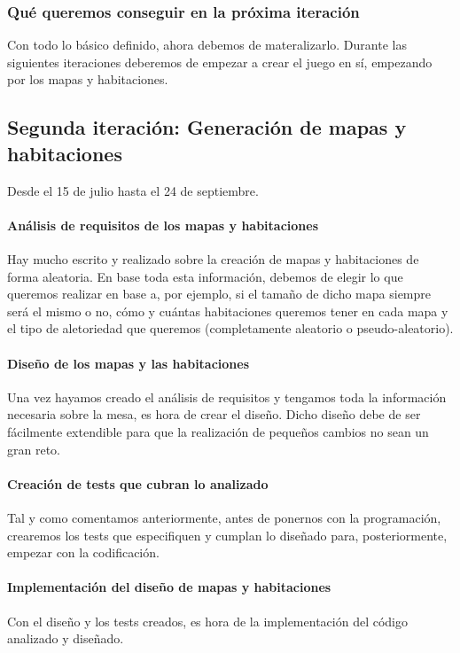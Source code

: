 \subsubsection{Qué queremos conseguir en la próxima iteración}

Con todo lo básico definido, ahora debemos de materalizarlo. Durante las siguientes iteraciones deberemos de empezar a crear el juego en sí, empezando por los mapas y habitaciones.

\subsection{Segunda iteración: Generación de mapas y habitaciones}

Desde el 15 de julio hasta el 24 de septiembre.

\paragraph{Análisis de requisitos de los mapas y habitaciones} Hay mucho escrito y realizado sobre la creación de mapas y habitaciones de forma aleatoria. En base toda esta información, debemos de elegir lo que queremos realizar en base a, por ejemplo, si el tamaño de dicho mapa siempre será el mismo o no, cómo y cuántas habitaciones queremos tener en cada mapa y el tipo de aletoriedad que queremos (completamente aleatorio o pseudo-aleatorio).

\paragraph{Diseño de los mapas y las habitaciones} Una vez hayamos creado el análisis de requisitos y tengamos toda la información necesaria sobre la mesa, es hora de crear el diseño. Dicho diseño debe de ser fácilmente extendible para que la realización de pequeños cambios no sean un gran reto.

\paragraph{Creación de tests que cubran lo analizado} Tal y como comentamos anteriormente, antes de ponernos con la programación, crearemos los tests que especifiquen y cumplan lo diseñado para, posteriormente, empezar con la codificación.

\paragraph{Implementación del diseño de mapas y habitaciones} Con el diseño y los tests creados, es hora de la implementación del código analizado y diseñado.

